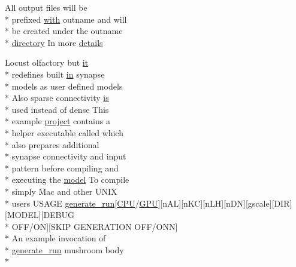 \begin{DoxyCompactItemize}
All output files will be \\*
prefixed \hyperlink{userproject_2OneComp__project_2README_8txt_ace09bb40fbf4457ad9a9340a67a4fa9a}{with} outname and will \\*
be created under the outname \\*
\hyperlink{README_8txt_ae619b68020535fba5ac79522a0d9d1c4}{directory} In more \hyperlink{userproject_2MBody__userdef__project_2README_8txt_a8a530a3a68382c4ca5a4e7fe605b81b0}{details}
\item 
Locust olfactory but \hyperlink{userproject_2PoissonIzh__project_2README_8txt_a3e3bbb6c9b14c38757cf273a117e43e8}{it} \\*
redefines built \hyperlink{README_8txt_a148897a6b2cc9cff25af80abb13426b0}{in} synapse \\*
models as user defined models \\*
Also sparse connectivity \hyperlink{userproject_2MBody__userdef__project_2README_8txt_a7b4e6cf78d14ce882cb8ff127e01babd}{is} \\*
used instead of dense This \\*
example \hyperlink{userproject_2SynDelay__project_2README_8txt_a762c750134e07a31b7965860fd292b51}{project} contains a \\*
helper executable called which \\*
also prepares additional \\*
synapse connectivity and input \\*
pattern before compiling and \\*
executing the \hyperlink{README_8txt_a69fd801b7213948c12d9dd7eebb3ed14}{model} To compile \\*
simply Mac and other U\+N\+I\+X \\*
users U\+S\+A\+G\+E \hyperlink{userproject_2MBody__userdef__project_2README_8txt_a320a215d1e27b4de394be70e90d22863}{generate\+\_\+run}\mbox{[}\hyperlink{README_8txt_a74a069e3c75797de2636c4dd14daa147}{C\+P\+U}/\hyperlink{modelSpec_8h_a39cb9803524b6f3b783344b2f89867b4}{G\+P\+U}\mbox{]}\mbox{[}n\+A\+L\mbox{]}\mbox{[}n\+K\+C\mbox{]}\mbox{[}n\+L\+H\mbox{]}\mbox{[}n\+D\+N\mbox{]}\mbox{[}gscale\mbox{]}\mbox{[}D\+I\+R\mbox{]}\mbox{[}M\+O\+D\+E\+L\mbox{]}\mbox{[}D\+E\+B\+U\+G \\*
O\+F\+F/O\+N\mbox{]}\mbox{[}S\+K\+I\+P G\+E\+N\+E\+R\+A\+T\+I\+O\+N O\+F\+F/O\+N\+N\mbox{]} \\*
An example invocation of \\*
\hyperlink{userproject_2MBody__userdef__project_2README_8txt_a320a215d1e27b4de394be70e90d22863}{generate\+\_\+run} mushroom body \\*

\end{DoxyCompactItemize}
